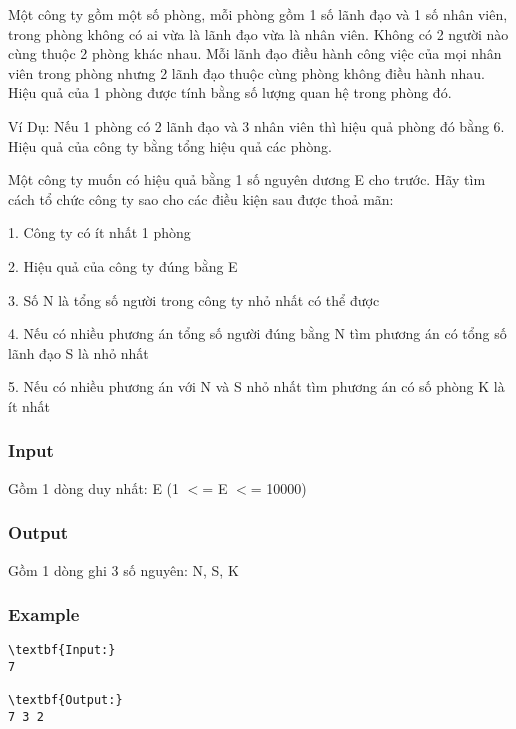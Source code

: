 



   Một công ty gồm một số phòng, mỗi phòng gồm 1 số lãnh đạo và 1 số nhân viên, trong phòng không có ai vừa là lãnh đạo vừa là nhân viên. Không có 2 người nào cùng thuộc 2 phòng khác nhau. Mỗi lãnh đạo điều hành công việc của mọi nhân viên trong phòng nhưng 2 lãnh đạo thuộc cùng phòng không điều hành nhau. Hiệu quả của 1 phòng được tính bằng số lượng quan hệ trong phòng đó.  

   Ví Dụ: Nếu 1 phòng có 2 lãnh đạo và 3 nhân viên thì hiệu quả phòng đó bằng 6. Hiệu quả của công ty bằng tổng hiệu quả các phòng.  

   Một công ty muốn có hiệu quả bằng 1 số nguyên dương E cho trước. Hãy tìm cách tổ chức công ty sao cho các điều kiện sau được thoả mãn:  

   1. Công ty có ít nhất 1 phòng  

   2. Hiệu quả của công ty đúng bằng E  

   3. Số N là tổng số người trong công ty nhỏ nhất có thể được  

   4. Nếu có nhiều phương án tổng số người đúng bằng N tìm phương án có tổng số lãnh đạo S là nhỏ nhất  

   5. Nếu có nhiều phương án với N và S nhỏ nhất tìm phương án có số phòng K là ít nhất  

\subsubsection{   Input  }

   Gồm 1 dòng duy nhất: E (1 $<$= E $<$= 10000)  

\subsubsection{   Output  }

   Gồm 1 dòng ghi 3 số nguyên: N, S, K  

\subsubsection{   Example  }
\begin{verbatim}
\textbf{Input:}
7

\textbf{Output:}
7 3 2
\end{verbatim}